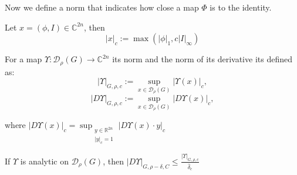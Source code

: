 Now we define a norm that indicates how close a map $\Phi$ is to the identity.

\begin{definition}
Let $x = (\phi,I) \in \mathbb{C}^{2n}$, then
$$|x|_c := \max(|\phi|_1, c|I|_\infty)$$
\end{definition}

\begin{definition}
For a map $\Upsilon :\mathcal{D}_\rho(G)\rightarrow \mathbb{C}^{2n}$ its norm and the norm of its derivative its defined as:
$$ |\Upsilon|_{G,\rho,c}:=\sup_{x\in\mathcal{D}_\rho(G)}|\Upsilon(x)|_c,$$
$$ |D\Upsilon|_{G,\rho,c}:=\sup_{x\in\mathcal{D}_\rho(G)}|D\Upsilon(x)|_c,$$

where $\displaystyle |D\Upsilon(x)|_c = \sup_{\substack{y\in\mathbb{R}^{2n} \\ |y|_c = 1}}|D\Upsilon(x)\cdot y|_c$
\end{definition}

\begin{lemma}
If $\Upsilon$ is analytic on $\mathcal{D}_\rho(G)$, then $|D\Upsilon|_{G,\rho-\delta,C} \leq \frac{|\Upsilon|_{G,\rho,c}}{\hat\delta_c}$
\end{lemma}


